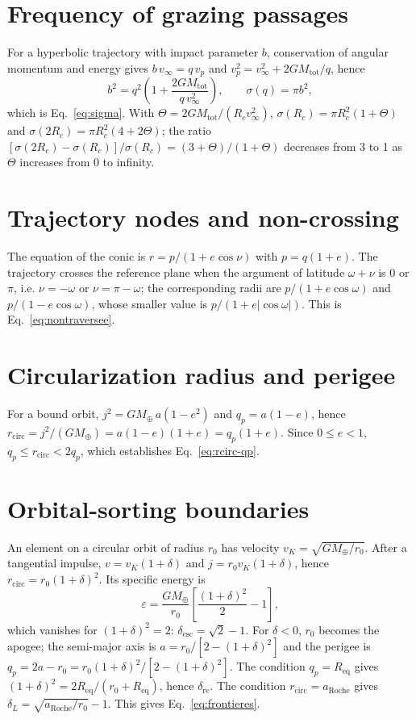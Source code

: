 \documentclass[11pt,a4paper,openany]{report}
\newcommand{\Mt}{M_{\oplus}}
\newcommand{\Req}{R_{\mathrm{eq}}}
\newcommand{\aR}{a_{\mathrm{Roche}}}
\newcommand{\Mtot}{M_{\mathrm{tot}}}
\begin{document}
\section{Frequency of grazing passages}

For a hyperbolic trajectory with impact parameter $b$, conservation of angular momentum and energy
gives $b\,v_\infty=q\,v_p$ and $v_p^2=v_\infty^2+2G\Mtot/q$, hence
\begin{equation}
b^2=q^2\left(1+\frac{2G\Mtot}{q\,v_\infty^2}\right),\qquad \sigma(q)=\pi b^2,
\end{equation}
which is Eq.~\eqref{eq:sigma}. With $\Theta=2G\Mtot/(R_cv_\infty^2)$,
$\sigma(R_c)=\pi R_c^2(1+\Theta)$ and $\sigma(2R_c)=\pi R_c^2(4+2\Theta)$; the ratio
$[\sigma(2R_c)-\sigma(R_c)]/\sigma(R_c)=(3+\Theta)/(1+\Theta)$ decreases from 3 to 1 as $\Theta$
increases from 0 to infinity.

\section{Trajectory nodes and non-crossing}

The equation of the conic is $r=p/(1+e\cos\nu)$ with $p=q(1+e)$. The trajectory crosses the
reference plane when the argument of latitude $\omega+\nu$ is $0$ or $\pi$, i.e. $\nu=-\omega$ or
$\nu=\pi-\omega$; the corresponding radii are $p/(1+e\cos\omega)$ and $p/(1-e\cos\omega)$, whose
smaller value is $p/(1+e|\cos\omega|)$. This is Eq.~\eqref{eq:nontraversee}.

\section{Circularization radius and perigee}
\label{app:rcirc}

For a bound orbit, $j^2=G\Mt\,a(1-e^2)$ and $q_p=a(1-e)$, hence
$r_{\mathrm{circ}}=j^2/(G\Mt)=a(1-e)(1+e)=q_p(1+e)$. Since $0\le e<1$,
$q_p\le r_{\mathrm{circ}}<2q_p$, which establishes Eq.~\eqref{eq:rcirc-qp}.

\section{Orbital-sorting boundaries}
\label{app:tri}

An element on a circular orbit of radius $r_0$ has velocity $v_K=\sqrt{G\Mt/r_0}$. After a tangential
impulse, $v=v_K(1+\delta)$ and $j=r_0v_K(1+\delta)$, hence
$r_{\mathrm{circ}}=r_0(1+\delta)^2$. Its specific energy is
\begin{equation}
\varepsilon=\frac{G\Mt}{r_0}\left[\frac{(1+\delta)^2}{2}-1\right],
\end{equation}
which vanishes for $(1+\delta)^2=2$: $\delta_{\mathrm{esc}}=\sqrt2-1$. For $\delta<0$, $r_0$ becomes
the apogee; the semi-major axis is $a=r_0/[2-(1+\delta)^2]$ and the perigee is
$q_p=2a-r_0=r_0(1+\delta)^2/[2-(1+\delta)^2]$. The condition $q_p=\Req$ gives
$(1+\delta)^2=2\Req/(r_0+\Req)$, hence $\delta_{\mathrm{re}}$. The condition
$r_{\mathrm{circ}}=\aR$ gives $\delta_L=\sqrt{\aR/r_0}-1$. This gives Eq.~\eqref{eq:frontieres}.
\end{document}
